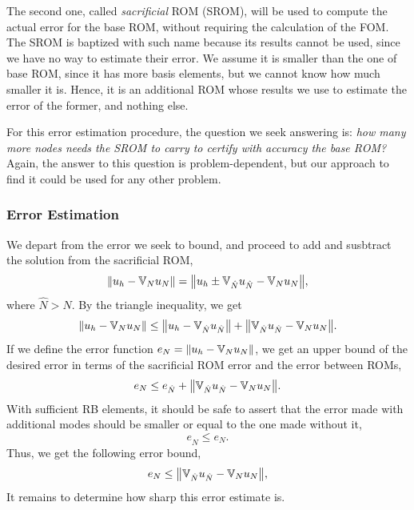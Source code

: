 \documentclass[../../thesis.tex]{subfiles}
\newcommand{\rbV}{\ensuremath{\mathbb{V}}}
\begin{document}
The second one, called \textit{sacrificial} ROM (SROM),
will be used to compute the actual error for the base ROM,
without requiring the calculation of the FOM.
The SROM is baptized with such name because its results cannot be used,
since we have no way to estimate their error.
We assume it is smaller than the one of base ROM, since it has more basis elements,
but we cannot know how much smaller it is.
Hence, it is an additional ROM whose results we use to estimate the error of the former, 
and nothing else.

For this error estimation procedure, the question we seek answering is:
\textit{how many more nodes needs the SROM to carry to certify with accuracy the base ROM?}
Again, the answer to this question is problem-dependent,
but our approach to find it could be used for any other problem.

\subsubsection{Error Estimation}
We depart from the error we seek to bound,
and proceed to add and susbtract the solution from the sacrificial ROM,
\begin{equation}
    \norm{u_h - \rbV_{N} u_N} = \norm{u_h \pm \rbV_{\hat{N}} u_{\hat{N}} - \rbV_{N} u_{N}},
\end{equation}
where $\hat{N} > N$. 
By the triangle inequality, we get
\begin{equation}
    \norm{u_h - \rbV_{N} u_N} \leq \norm{u_h - \rbV_{\hat{N}} u_{\hat{N}}} + \norm{\rbV_{\hat{N}} u_{\hat{N}} - \rbV_{N} u_{N}}.
\end{equation}
If we define the error function $e_N = \norm{u_h - \rbV_{N} u_N}$, 
we get an upper bound of the desired error in terms of the sacrificial ROM error and the error between ROMs,
\begin{equation}
    e_N \leq e_{\hat{N}} + \norm{\rbV_{\hat{N}} u_{\hat{N}} - \rbV_{N} u_{N}}.
\end{equation}
With sufficient RB elements, it should be safe to assert that the error made 
with additional modes should be smaller or equal to the one made without it,
\begin{equation}
    e_{\hat{N}} \leq e_{N}.
\end{equation}
Thus, we get the following error bound,
\begin{equation}
    e_N \leq \norm{\rbV_{\hat{N}} u_{\hat{N}} - \rbV_{N} u_{N}},
\end{equation}
It remains to determine how sharp this error estimate is.
\end{document}
